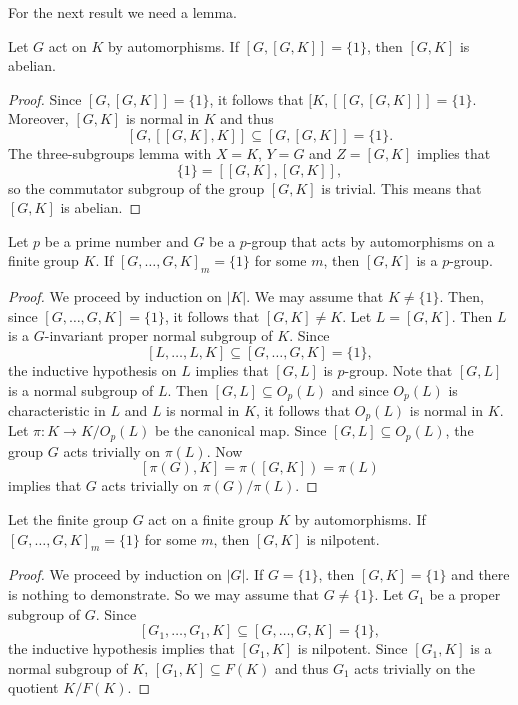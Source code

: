 For the next result we need a lemma.

\begin{lemma}
\label{lem:[G,K]abelian}
Let $G$ act on $K$ by automorphisms. If $[G,[G,K]]=\{1\}$, then $[G,K]$ is abelian.	
\end{lemma}

\begin{proof}
	Since $[G,[G,K]]=\{1\}$, it follows that $[K,[[G,[G,K]]]=\{1\}$. Moreover, $[G,K]$ is normal in $K$ and thus 
	\[
	[G,[[G,K],K]]\subseteq [G,[G,K]]=\{1\}. 
	\]
	The three-subgroups lemma with $X=K$, $Y=G$ and $Z=[G,K]$ implies that
	\[
	\{1\}=[[G,K],[G,K]],
	\]
	so the commutator subgroup of the group 
	$[G,K]$ is trivial. This means that $[G,K]$ is abelian. 
\end{proof}


\begin{theorem}
\label{thm:[G,K]_pgroup}
	Let $p$ be a prime number 
	and $G$ be a $p$-group that acts by automorphisms on a finite group $K$. If $[G,\dots,G,K]_m=\{1\}$ for some 
	$m$, then $[G,K]$ is a $p$-group. 
\end{theorem}

\begin{proof}
	We proceed by induction on $|K|$. We may assume that $K\ne\{1\}$. Then, since $[G,\dots,G,K]=\{1\}$, 
	it follows that $[G,K]\ne K$. Let $L=[G,K]$. Then $L$ is a $G$-invariant proper 
	normal subgroup of $K$. Since 
	\[
	[L,\dots,L,K]\subseteq [G,\dots,G,K]=\{1\},
	\]
	the inductive hypothesis on $L$ implies that $[G,L]$ is $p$-group. 
	Note that $[G,L]$ is a normal subgroup of $L$. Then $[G,L]\subseteq O_p(L)$ and since $O_p(L)$ is characteristic in $L$
	and $L$ is normal in $K$, it follows
	that $O_p(L)$ is normal in $K$. Let $\pi\colon K\to K/O_p(L)$ be the canonical map. Since $[G,L]\subseteq O_p(L)$, the group 
	$G$ acts trivially on $\pi(L)$. Now
	\[
	[\pi(G),K]=\pi([G,K])=\pi(L)
	\]
	implies that $G$ acts trivially on $\pi(G)/\pi(L)$.	
\end{proof}

\begin{theorem}
	Let the finite group $G$ act on a finite group $K$ by automorphisms. 
	If $[G,\dots,G,K]_m=\{1\}$ for some $m$, then
	$[G,K]$ is nilpotent. 
\end{theorem}

\begin{proof}
	We proceed by induction on $|G|$. If $G=\{1\}$, then $[G,K]=\{1\}$ and there is nothing to demonstrate. So we may assume 
	that $G\ne\{1\}$. Let $G_1$ be a proper subgroup of $G$. Since 
	\[
	[G_1,\dots,G_1,K]\subseteq [G,\dots,G,K]=\{1\},
	\]
	the inductive hypothesis implies that $[G_1,K]$ is nilpotent. Since $[G_1,K]$ is a normal subgroup of $K$, 
	$[G_1,K]\subseteq F(K)$ and thus $G_1$ acts trivially on the quotient $K/F(K)$. 
\end{proof}

